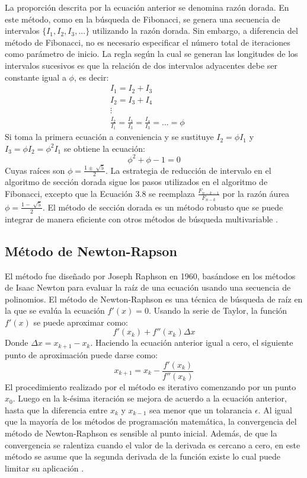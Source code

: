 La proporción descrita por la ecuación anterior se denomina razón dorada. En este método, como en la búsqueda de Fibonacci, se genera una secuencia de intervalos $\{I_1, I_2, I_3, ...\}$ utilizando la razón dorada. Sin embargo, a diferencia del método de Fibonacci, no es necesario especificar el número total de iteraciones como parámetro de inicio. La regla según la cual se generan las longitudes de los intervalos sucesivos es que la relación de dos intervalos adyacentes debe ser constante igual a $\phi$, es decir:
\begin{equation}
\begin{aligned}
 I_1 = I_2 + I_3 & &\\
 I_2 = I_3 + I_4 & &\\
 \vdots & &
\\
\frac{I_2}{I_{1}}=\frac{I_3}{I_{3}}= \frac{I_4}{I_{3}}=\ldots=\phi
\end{aligned}
\end{equation}
Si toma la primera ecuación a conveniencia y se sustituye $I_2 =  \phi I_1 $ y  $I_3 = \phi I_2=\phi^2 I_1$ se obtiene la ecuación:
\begin{equation}
 \phi^2 + \phi -1=0
\end{equation}
Cuyas raíces son $\phi=\frac{1 \pm \sqrt[]{5}}{2}$. 
La estrategia de reducción de intervalo en el algoritmo de sección dorada sigue los pasos utilizados en el algoritmo de Fibonacci, excepto que la Ecuación 3.8 se reemplaza $\frac{F_{n-k-1}}{ F_{n-k}}$ por la razón áurea $\phi=\frac{1 - \sqrt[]{5}}{2}$. El método de sección dorada es un método robusto que se puede integrar de manera eficiente con otros métodos de búsqueda multivariable \cite{belegundu_optimization_2011}.
\subsection{Método de Newton-Rapson}
El método fue diseñado por Joseph Raphson en 1960, basándose en los métodos de Isaac Newton para evaluar la raíz de una ecuación usando una secuencia de polinomios.  El método de Newton-Raphson es una técnica de búsqueda de raíz en la que se evalúa la ecuación $f'(x) = 0$. Usando la serie de Taylor, la función $f'(x)$ se puede aproximar como:
\begin{equation}
 f'(x_k) + f''(x_k)\Delta x
\end{equation}
Donde $\Delta x=  x_{k+1}-x_k$. Haciendo la ecuación anterior igual a cero, el siguiente punto de aproximación puede darse como:
\begin{equation}
 x_{k+1}=x_k - \frac{f'(x_k)}{f''(x_k)} 
\end{equation}
El procedimiento realizado por el método es iterativo comenzando por un punto $x_0$. Luego en la k-ésima iteración se mejora de acuerdo a la ecuación anterior, hasta que la diferencia entre $x_k$  y $x_{k-1}$ sea menor que un tolarancia $\epsilon$. Al igual que la mayoría de los métodos de programación matemática, la convergencia del método de Newton-Raphson es sensible al punto inicial. Además, de que la convergencia se ralentiza cuando el valor de la derivada es cercano a cero, en este método se asume que la segunda derivada de la función existe lo cual puede limitar su aplicación \cite{rao_engineering_2009}.
